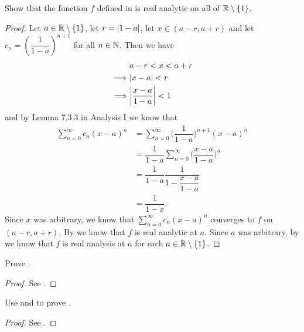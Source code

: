 \begin{ex}\label{ii:ex:4.2.2}
  Show that the function \(f\) defined in  is real analytic on all of \(\mathbb{R} \setminus \left\lbrace1\right\rbrace\).
\end{ex}

\begin{proof}
  Let \(a \in \mathbb{R} \setminus \left\lbrace1\right\rbrace\), let \(r = \left\lvert1 - a\right\rvert\), let \(x \in (a - r, a + r)\) and let \(c_n = (\dfrac{1}{1 - a})^{n + 1}\) for all \(n \in \mathbb{N}\).
  Then we have
  \begin{align*}
             & a - r < x < a + r              \\
    \implies & \abs{x - a} < r                \\
    \implies & \abs{\dfrac{x - a}{1 - a}} < 1
  \end{align*}
  and by Lemma 7.3.3 in Analysis I we know that
  \begin{align*}
    \sum_{n = 0}^\infty c_n (x - a)^n & = \sum_{n = 0}^\infty \bigg(\dfrac{1}{1 - a}\bigg)^{n + 1} (x - a)^n      \\
                                      & = \dfrac{1}{1 - a} \sum_{n = 0}^\infty \bigg(\dfrac{x - a}{1 - a}\bigg)^n \\
                                      & = \dfrac{1}{1 - a} \dfrac{1}{1 - \dfrac{x - a}{1 - a}}                    \\
                                      & = \dfrac{1}{1 - x}.
  \end{align*}
  Since \(x\) was arbitrary, we know that \(\sum_{n = 0}^\infty c_n (x - a)^n\) converges to \(f\) on \((a - r, a + r)\).
  By  we know that \(f\) is real analytic at \(a\).
  Since \(a\) was arbitrary, by  we know that \(f\) is real analysis at \(a\) for each \(a \in \mathbb{R} \setminus \left\lbrace1\right\rbrace\).
\end{proof}

\begin{ex}\label{ii:ex:4.2.3}
  Prove .
\end{ex}

\begin{proof}
  See .
\end{proof}

\begin{ex}\label{ii:ex:4.2.4}
  Use  and  to prove .
\end{ex}

\begin{proof}
  See .
\end{proof}

